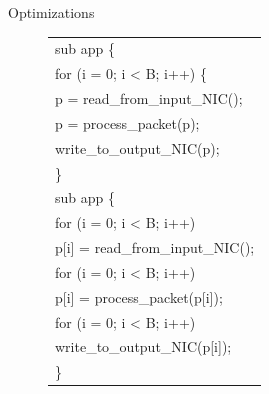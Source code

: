 \documentclass[final]{beamer}
\newlength{\sepwid}
\newlength{\onecolwid}
\newlength{\twocolwid}
\begin{document}
\begin{frame}
\begin{columns}[t]
\begin{column}{\twocolwid}
\begin{exampleblock}{Optimizations}
\begin{multicols}{3}
\begin{figure}[ht]
\begin{small}
\begin{tabular}[b]{p{\onecolwid}}
sub app \{ \\
\hspace{0.2\sepwid}for (i = 0; i < B; i++) \{ \\
\hspace{0.4\sepwid}p = read\_from\_input\_NIC(); \\
\hspace{0.4\sepwid}p = process\_packet(p); \\
\hspace{0.4\sepwid}write\_to\_output\_NIC(p); \\
\hspace{0.2\sepwid}\} 
\\
sub app \{\\
\hspace{0.2\sepwid}for (i = 0; i < B; i++)\\
\hspace{0.4\sepwid}p[i] = read\_from\_input\_NIC();\\
\hspace{0.2\sepwid}for (i = 0; i < B; i++)\\
\hspace{0.4\sepwid}p[i] = process\_packet(p[i]);\\
\hspace{0.2\sepwid}for (i = 0; i < B; i++)\\
\hspace{0.4\sepwid}write\_to\_output\_NIC(p[i]);\\
\}\\
\end{tabular}
\end{small}
\end{figure}


\end{multicols}
\end{exampleblock}
\end{column}
\end{columns}
\end{frame}
\end{document}
